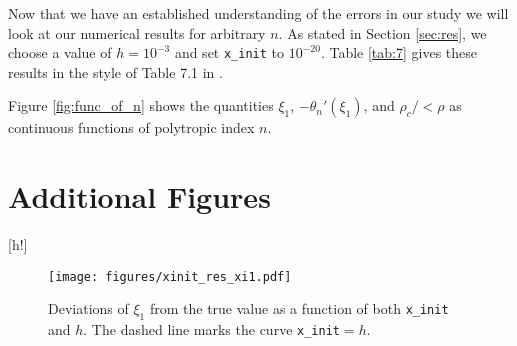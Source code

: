 \documentclass[twocolumn]{aastex631}
\begin{document}
Now that we have an established understanding of the errors in our study
we will look at our numerical results for arbitrary $n$. As stated in
Section \ref{sec:res}, we choose a value of $h=10^{-3}$ and set 
\texttt{x\_init} to $10^{-20}$. Table \ref{tab:7} gives these results
in the style of Table 7.1 in \citet{textbook}.



Figure \ref{fig:func_of_n} shows the quantities $\xi_1$, $-\theta_n'(\xi_1)$,
and $\rho_c/<\rho$ as continuous functions of polytropic index $n$.


\appendix

\section{Additional Figures}
\label{sec:figs}[h!]
\begin{figure*}
    \begin{centering}
        \texttt{[image: figures/xinit\_res\_xi1.pdf]}
        \caption{Deviations of $\xi_1$ from the true value as a function
        of both \texttt{x\_init} and $h$. The dashed line
        marks the curve \texttt{x\_init}$=h$.}
        \label{fig:xinit_res_xi1}
    \end{centering}
\end{figure*}










\end{document}
